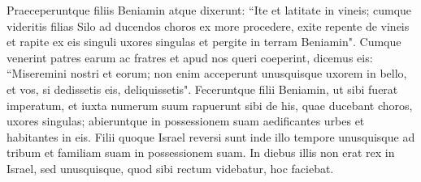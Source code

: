 \begin{biblechapter}
\verse Praeceperuntque filiis Beniamin atque dixerunt: “Ite et latitate in vineis; 
\verse cumque videritis filias Silo ad ducendos choros ex more procedere, exite repente de vineis et rapite ex eis singuli uxores singulas et pergite in terram Beniamin". 
\verse Cumque venerint patres earum ac fratres et apud nos queri coeperint, dicemus eis: “Miseremini nostri et eorum; non enim acceperunt unusquisque uxorem in bello, et vos, si dedissetis eis, deliquissetis". 
\verse Feceruntque filii Beniamin, ut sibi fuerat imperatum, et iuxta numerum suum rapuerunt sibi de his, quae ducebant choros, uxores singulas; abieruntque in possessionem suam aedificantes urbes et habitantes in eis. 
\verse Filii quoque Israel reversi sunt inde illo tempore unusquisque ad tribum et familiam suam in possessionem suam. 
\verse In diebus illis non erat rex in Israel, sed unusquisque, quod sibi rectum videbatur, hoc faciebat.
\end{biblechapter}
